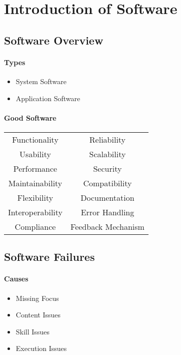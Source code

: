 \documentclass[12pt,openany]{book}
\begin{document}
\chapter{Introduction of Software}
\section{Software Overview}
\subsubsection{Types}
\begin{itemize}
    \item System Software
    \item Application Software
\end{itemize}

\subsubsection{Good Software}
\begin{table}[H]
    \centering
    \begin{tabular}{cc}

        Functionality & Reliability \\

        Usability & Scalability \\

        Performance & Security \\

        Maintainability & Compatibility \\

        Flexibility & Documentation \\
        
        Interoperability & Error Handling \\
        
        Compliance & Feedback Mechanism \\
        
    \end{tabular}
\end{table}

\section{Software Failures}
\subsubsection{Causes}
\begin{itemize}
    \item Missing Focus
    \item Content Issues
    \item Skill Issues
    \item Execution Issues
\end{itemize}
\end{document}
